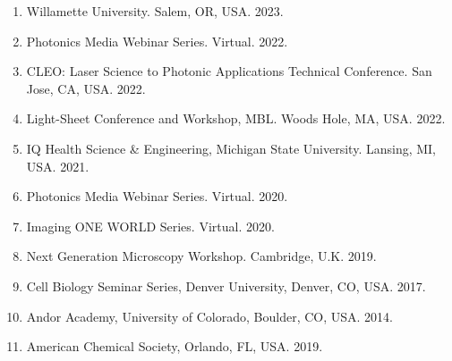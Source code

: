 \begin{enumerate}
\item Willamette University.  Salem, OR, USA. 2023.
\item Photonics Media Webinar Series.   Virtual. 2022.
\item CLEO: Laser Science to Photonic Applications Technical Conference. San Jose, CA, USA. 2022.
\item Light-Sheet Conference and Workshop, MBL.  Woods Hole, MA, USA. 2022.
\item IQ Health Science \& Engineering, Michigan State University. Lansing, MI, USA. 2021.
\item Photonics Media Webinar Series.  Virtual. 2020.
\item Imaging ONE WORLD Series. Virtual. 2020.
\item Next Generation Microscopy Workshop.  Cambridge, U.K. 2019.
\item Cell Biology Seminar Series, Denver University, Denver, CO, USA. 2017.
\item Andor Academy, University of Colorado, Boulder, CO, USA. 2014.
\item American Chemical Society, Orlando, FL, USA. 2019.
\end{enumerate}